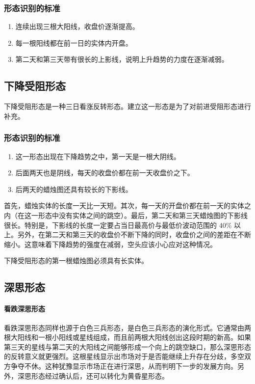 \subsubsection*{形态识别的标准}
\begin{enumerate}
    \item 连续出现三根大阳线，收盘价逐渐提高。
    \item 每一根阳线都在前一日的实体内开盘。
    \item 第二天和第三天带有很长的上影线，说明上升趋势的力度在逐渐减弱。
\end{enumerate}
\subsection{下降受阻形态}
下降受阻形态是一种三日看涨反转形态。建立这一形态是为了对前进受阻形态进行补充。
\subsubsection*{形态识别的标准}
\begin{enumerate}
    \item 这一形态出现在下降趋势之中，第一天是一根大阴线。
    \item 后面两天也是阴线，每天的收盘价都在前一天收盘价之下。
    \item 后两天的蜡烛图还具有较长的下影线。
\end{enumerate}

首先，蜡烛实体的长度一天比一天短。其次，每一天的开盘价都在前一天的实体之内（在这一形态中没有实体之间的跳空）。最后，第二天和第三天蜡烛图的下影线很长。特别是，下影线的长度一定要占当日最高价与最低价波动范围的 40\% 以上。另外，在第二天和第三天的收盘价不断下降的同时，收盘价之间的差距在不断缩小。这意味着下降趋势的强度在减弱，空头应该小心应对这种情况。

下降受阻形态的第一根蜡烛图必须具有长实体。
\subsection{深思形态}
\paragraph{看跌深思形态} 看跌深思形态同样也源于白色三兵形态，是白色三兵形态的演化形式。它通常由两根大阳线和一根小阳线或星线组成，而且前两根大阳线创出这段时期的新高。如果第三天的星线与第二天的大阳线之间能够形成一个向上的跳空缺口，那么深思形态的反转意义就更强烈。这根星线显示出市场对于是否能继续上升存在分歧，多空双方争夺不休。这种犹豫显示市场正在进行深思，从而判明下一步的发展方向。另外，深思形态经过确认后，还可以转化为黄昏星形态。

